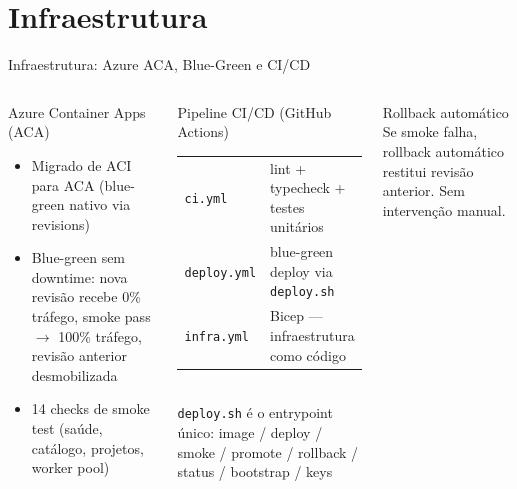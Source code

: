 \documentclass[aspectratio=169,10pt]{beamer}
\begin{document}
\section{Infraestrutura}

\begin{frame}{Infraestrutura: Azure ACA, Blue-Green e CI/CD}
  \begin{columns}[T]
    \begin{block}{Azure Container Apps (ACA)}
      \begin{itemize}\scriptsize
        \item Migrado de ACI para ACA (blue-green nativo via revisions)
        \item Blue-green sem downtime: nova revisão recebe 0\% tráfego,
              smoke pass $\to$ 100\% tráfego, revisão anterior desmobilizada
        \item 14 checks de smoke test (saúde, catálogo, projetos, worker pool)
      \end{itemize}
    \end{block}
    \vspace{4pt}
    \begin{block}{Pipeline CI/CD (GitHub Actions)}
      \begin{tabular}{ll}\scriptsize
        \texttt{ci.yml}     & lint + typecheck + testes unitários \\
        \texttt{deploy.yml} & blue-green deploy via \texttt{deploy.sh} \\
        \texttt{infra.yml}  & Bicep --- infraestrutura como código \\
      \end{tabular}\\[4pt]
      {\scriptsize \texttt{deploy.sh} é o entrypoint único: image / deploy /
      smoke / promote / rollback / status / bootstrap / keys}
    \end{block}
    \vspace{4pt}
    \begin{alertblock}{\small Rollback automático}
      \scriptsize Se smoke falha, rollback automático restitui revisão anterior.
      Sem intervenção manual.
    \end{alertblock}


\end{columns}
\end{frame}
\end{document}

